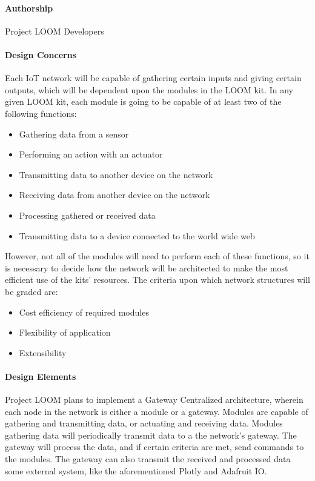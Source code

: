 \documentclass[onecolumn, draftclsnofoot,10pt, compsoc]{IEEEtran}
\begin{document}
\paragraph{Authorship}
    Project LOOM Developers

\paragraph{Design Concerns}
    Each IoT network will be capable of gathering certain inputs and giving certain outputs, which will be dependent upon the modules in the LOOM kit. In any given LOOM kit, each module is going to be capable of at least two of the following functions:

    \begin{itemize}[noitemsep,topsep=-10pt]
        \item Gathering data from a sensor
        \item Performing an action with an actuator
        \item Transmitting data to another device on the network
        \item Receiving data from another device on the network
        \item Processing gathered or received data
        \item Transmitting data to a device connected to the world wide web
	\end{itemize}
	
	However, not all of the modules will need to perform each of these functions, so it is necessary to decide how the network will be architected to make the most efficient use of the kits' resources. The criteria upon which network structures will be graded are: 
	
	\begin{itemize}[noitemsep,topsep=-10pt]
        \item Cost efficiency of required modules
        \item Flexibility of application
        \item Extensibility
    \end{itemize}

\paragraph{Design Elements}
    Project LOOM plans to implement a Gateway Centralized architecture, wherein each node in the network is either a module or a gateway. Modules are capable of gathering and transmitting data, or actuating and receiving data. Modules gathering data will periodically transmit data to a the network's gateway. The gateway will process the data, and if certain criteria are met, send commands to the modules. The gateway can also transmit the received and processed data some external system, like the aforementioned Plotly and Adafruit IO. 
\end{document}
